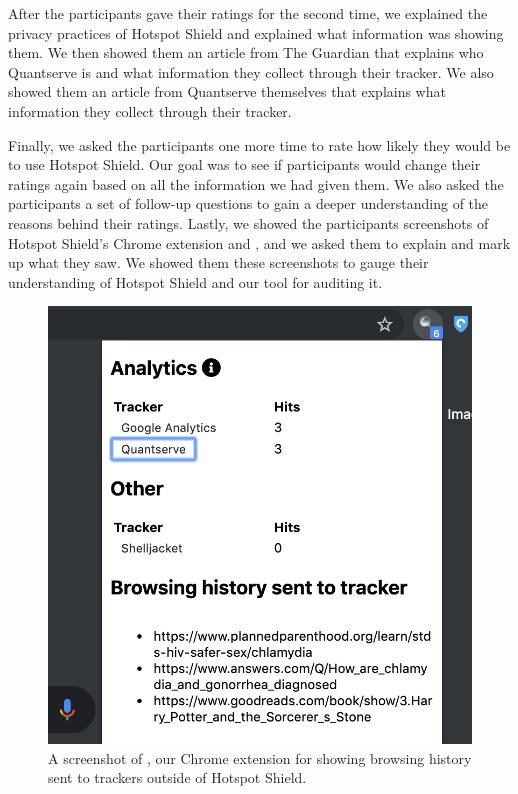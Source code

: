 After the participants gave their ratings for the second time, we explained the privacy practices of Hotspot Shield and explained what information \tool was showing them.
We then showed them an article from The Guardian that explains who Quantserve is and what information they collect through their tracker.
We also showed them an article from Quantserve themselves that explains what information they collect through their tracker.

Finally, we asked the participants one more time to rate how likely they would
be to use Hotspot Shield. Our goal was to see if participants would change
their ratings again based on all the information we had given them.  We also
asked the participants a set of follow-up questions to gain a deeper
understanding of the reasons behind their ratings.  Lastly, we showed the
participants screenshots of Hotspot Shield's Chrome extension and \tool,
and we asked them to explain and mark up what they saw.  We showed them these
screenshots to gauge their understanding of Hotspot Shield and our tool for
auditing it.

\begin{figure}[t]
    \includegraphics[width=\linewidth]{sections/figures/vpn-audit.png}
    \caption{A screenshot of \tool, our Chrome extension for showing browsing history sent to trackers outside of Hotspot Shield.}
    \label{fig:vpn-audit}
\end{figure}

